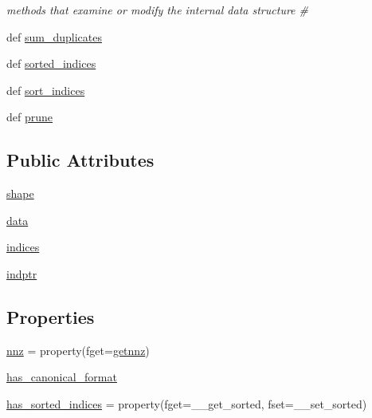 \begin{DoxyCompactItemize}
\begin{DoxyCompactList}\small\item\em methods that examine or modify the internal data structure \# \end{DoxyCompactList}\item 
def \hyperlink{classscipy_1_1sparse_1_1compressed_1_1__cs__matrix_aa24922d0d770a19795725a311c7c5567}{sum\+\_\+duplicates}
\item 
def \hyperlink{classscipy_1_1sparse_1_1compressed_1_1__cs__matrix_a7b5bc73d90e554c5549f02f5c466536c}{sorted\+\_\+indices}
\item 
def \hyperlink{classscipy_1_1sparse_1_1compressed_1_1__cs__matrix_a251e10c7d5ff8181abc6b851c29bfb67}{sort\+\_\+indices}
\item 
def \hyperlink{classscipy_1_1sparse_1_1compressed_1_1__cs__matrix_ae29dd864ab19a99c9c84aaa138b12c8e}{prune}
\end{DoxyCompactItemize}
\subsection*{Public Attributes}
\begin{DoxyCompactItemize}
\item 
\hyperlink{classscipy_1_1sparse_1_1compressed_1_1__cs__matrix_a96352422bdc7218081a6f6812a61c136}{shape}
\item 
\hyperlink{classscipy_1_1sparse_1_1compressed_1_1__cs__matrix_a0725180a6112848e50296c81375c5f8a}{data}
\item 
\hyperlink{classscipy_1_1sparse_1_1compressed_1_1__cs__matrix_a710a6ce9d6e4a4af603188f9cd2a10bf}{indices}
\item 
\hyperlink{classscipy_1_1sparse_1_1compressed_1_1__cs__matrix_af6234089d2e3e3a11fefb8376733e0c2}{indptr}
\end{DoxyCompactItemize}
\subsection*{Properties}
\begin{DoxyCompactItemize}
\item 
\hyperlink{classscipy_1_1sparse_1_1compressed_1_1__cs__matrix_a1140a7bbe239d44015eaac4c80098332}{nnz} = property(fget=\hyperlink{classscipy_1_1sparse_1_1compressed_1_1__cs__matrix_a2484505df82345e384ac4cb664ecee38}{getnnz})
\item 
\hyperlink{classscipy_1_1sparse_1_1compressed_1_1__cs__matrix_a40ac43577f7746a5b5e24890efe80442}{has\+\_\+canonical\+\_\+format}
\item 
\hyperlink{classscipy_1_1sparse_1_1compressed_1_1__cs__matrix_a631319b4774678b04f1ce0072ef82af4}{has\+\_\+sorted\+\_\+indices} = property(fget=\+\_\+\+\_\+get\+\_\+sorted, fset=\+\_\+\+\_\+set\+\_\+sorted)
\end{DoxyCompactItemize}


